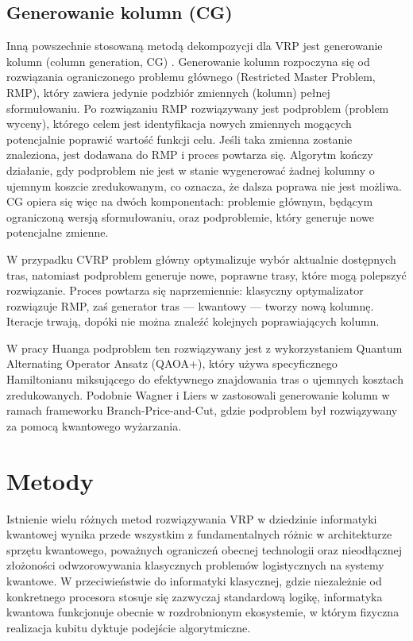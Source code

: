 \subsection{Generowanie kolumn (CG)}
Inną powszechnie stosowaną metodą dekompozycji dla VRP jest generowanie kolumn (column generation, CG) \cite{desaulniers2006column}. Generowanie kolumn rozpoczyna się od rozwiązania ograniczonego problemu głównego (Restricted Master Problem, RMP), który zawiera jedynie podzbiór zmiennych (kolumn) pełnej sformułowaniu. Po rozwiązaniu RMP rozwiązywany jest podproblem (problem wyceny), którego celem jest identyfikacja nowych zmiennych mogących potencjalnie poprawić wartość funkcji celu. Jeśli taka zmienna zostanie znaleziona, jest dodawana do RMP i proces powtarza się. Algorytm kończy działanie, gdy podproblem nie jest w stanie wygenerować żadnej kolumny o ujemnym koszcie zredukowanym, co oznacza, że dalsza poprawa nie jest możliwa.
CG opiera się więc na dwóch komponentach: problemie głównym, będącym ograniczoną wersją sformułowaniu, oraz podproblemie, który generuje nowe potencjalne zmienne.

W przypadku CVRP problem główny optymalizuje wybór aktualnie dostępnych tras, natomiast podproblem generuje nowe, poprawne trasy, które mogą polepszyć rozwiązanie. Proces powtarza się naprzemiennie: klasyczny optymalizator rozwiązuje RMP, zaś generator tras — kwantowy — tworzy nową kolumnę. Iteracje trwają, dopóki nie można znaleźć kolejnych poprawiających kolumn.

W pracy Huanga \cite{huang2025solvingcapacitatedvehiclerouting} podproblem ten rozwiązywany jest z wykorzystaniem Quantum Alternating Operator Ansatz (QAOA+), który używa specyficznego Hamiltonianu miksującego do efektywnego znajdowania tras o ujemnych kosztach zredukowanych.
Podobnie Wagner i Liers w \cite{wagner2024quantumsubroutinesbranchpriceandcutvehicle} zastosowali generowanie kolumn w ramach frameworku Branch-Price-and-Cut, gdzie podproblem był rozwiązywany za pomocą kwantowego wyżarzania.

\section{Metody}
Istnienie wielu różnych metod rozwiązywania VRP w dziedzinie informatyki kwantowej wynika przede wszystkim z fundamentalnych różnic w architekturze sprzętu kwantowego, poważnych ograniczeń obecnej technologii oraz nieodłącznej złożoności odwzorowywania klasycznych problemów logistycznych na systemy kwantowe. W przeciwieństwie do informatyki klasycznej, gdzie niezależnie od konkretnego procesora stosuje się zazwyczaj standardową logikę, informatyka kwantowa funkcjonuje obecnie w rozdrobnionym ekosystemie, w którym fizyczna realizacja kubitu dyktuje podejście algorytmiczne.

